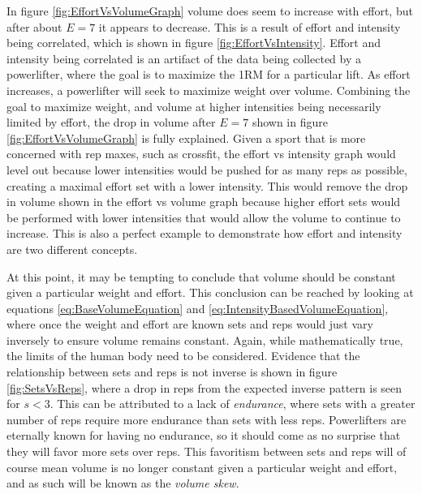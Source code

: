 In figure \ref{fig:EffortVsVolumeGraph} volume does seem to increase with effort, but after about $E=7$ it appears to decrease. This is a result of effort and intensity being correlated, which is shown in figure \ref{fig:EffortVsIntensity}. Effort and intensity being correlated is an artifact of the data being collected by a powerlifter, where the goal is to maximize the 1RM for a particular lift. As effort increases, a powerlifter will seek to maximize weight over volume. Combining the goal to maximize weight, and volume at higher intensities being necessarily limited by effort, the drop in volume after $E=7$ shown in figure \ref{fig:EffortVsVolumeGraph} is fully explained. Given a sport that is more concerned with rep maxes, such as crossfit, the effort vs intensity graph would level out because lower intensities would be pushed for as many reps as possible, creating a maximal effort set with a lower intensity. This would remove the drop in volume shown in the effort vs volume graph because higher effort sets would be performed with lower intensities that would allow the volume to continue to increase. This is also a perfect example to demonstrate how effort and intensity are two different concepts.

At this point, it may be tempting to conclude that volume should be constant given a particular weight and effort. This conclusion can be reached by looking at equations \ref{eq:BaseVolumeEquation} and \ref{eq:IntensityBasedVolumeEquation}, where once the weight and effort are known sets and reps would just vary inversely to ensure volume remains constant. Again, while mathematically true, the limits of the human body need to be considered. Evidence that the relationship between sets and reps is not inverse is shown in figure \ref{fig:SetsVsReps}, where a drop in reps from the expected inverse pattern is seen for $s<3$. This can be attributed to a lack of \textit{endurance}, where sets with a greater number of reps  require more endurance than sets with less reps. Powerlifters are eternally known for having no endurance, so it should come as no surprise that they will favor more sets over reps. This favoritism between sets and reps will of course mean volume is no longer constant given a particular weight and effort, and as such will be known as the \textit{volume skew}.

